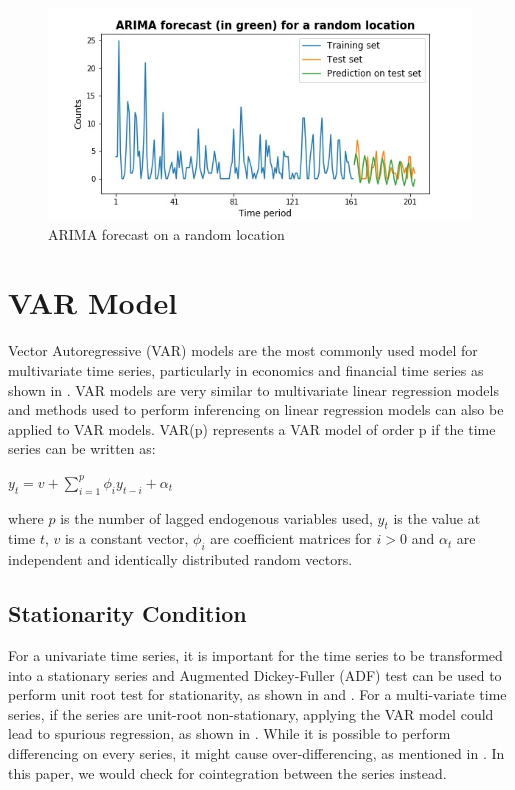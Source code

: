\documentclass[10pt, letterpaper] {article}
\begin{document}
\begin{figure}[H]
    \centering
    \includegraphics[width=\textwidth]{Images/forecast_example.jpg}
    \caption{ARIMA forecast on a random location}
    \label{fig:ARIMA forecast on a random location}
\end{figure}



\section{VAR Model}
Vector Autoregressive (VAR) models are the most commonly used model for multivariate time series, particularly in economics and financial time series as shown in \cite{Hilde2000}. VAR models are very similar to multivariate linear regression models and methods used to perform inferencing on linear regression models can also be applied to VAR models. VAR(p) represents a VAR model of order p if the time series can be written as: 

\begin{center}
    $\displaystyle y_t=v+\sum_{i=1}^{p} \phi_{i}y_{t-i}+\alpha_t$
\end{center}

\noindent where $p$ is the number of lagged endogenous variables used, $y_t$ is the value at time $t$, $v$ is a constant vector, $\phi_i$ are coefficient matrices for $i>0$ and $\alpha_t$ are independent and identically distributed random vectors. 

\subsection{Stationarity Condition}
For a univariate time series, it is important for the time series to be transformed into a stationary series and Augmented Dickey-Fuller (ADF) test can be used to perform unit root test for stationarity, as shown in \cite{Zhijie1998} and \cite{Rizwan2011}. For a multi-variate time series, if the series are unit-root non-stationary, applying the VAR model could lead to spurious regression, as shown in \cite{Baumohl2009}. While it is possible to perform differencing on every series, it might cause over-differencing, as mentioned in \cite{Ruey2014}. In this paper, we would check for cointegration between the series instead. 
\end{document}
